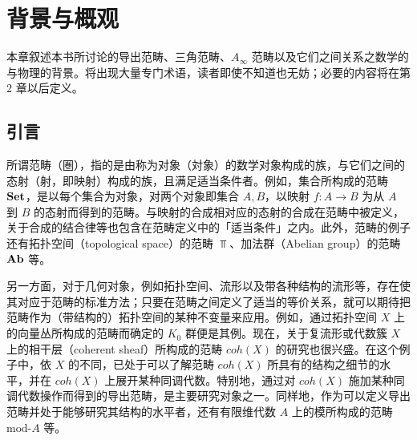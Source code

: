 \chapter{背景与概观}

本章叙述本书所讨论的导出范畴、三角范畴、$A_\infty$ 范畴以及它们之间关系之数学的与物理的背景。将出现大量专门术语，读者即使不知道也无妨；必要的内容将在第 2 章以后定义。

\section{引言}

所谓范畴（圏），指的是由称为对象（対象）的数学对象构成的族，与它们之间的态射（射，即映射）构成的族，且满足适当条件者。例如，集合所构成的范畴 $\mathbf{Set}$，是以每个集合为对象，对两个对象即集合 $A,B$，以映射 $f\colon A\to B$ 为从 $A$ 到 $B$ 的态射而得到的范畴。与映射的合成相对应的态射的合成在范畴中被定义，关于合成的结合律等也包含在范畴定义中的「适当条件」之内。此外，范畴的例子还有拓扑空间（topological space）的范畴 $\Top$、加法群（Abelian group）的范畴 $\mathbf{Ab}$ 等。


另一方面，对于几何对象，例如拓扑空间、流形以及带各种结构的流形等，存在使其对应于范畴的标准方法；只要在范畴之间定义了适当的等价关系，就可以期待把范畴作为（带结构的）拓扑空间的某种不变量来应用。例如，通过拓扑空间 $X$ 上的向量丛所构成的范畴而确定的 $K_0$ 群便是其例。现在，关于复流形或代数簇 $X$ 上的相干层（coherent sheaf）所构成的范畴 $\mathit{coh}(X)$ 的研究也很兴盛。在这个例子中，依 $X$ 的不同，已处于可以了解范畴 $\mathit{coh}(X)$ 所具有的结构之细节的水平，并在 $\mathit{coh}(X)$ 上展开某种同调代数。特别地，通过对 $\mathit{coh}(X)$ 施加某种同调代数操作而得到的导出范畴，是主要研究对象之一。同样地，作为可以定义导出范畴并处于能够研究其结构的水平者，还有有限维代数 $A$ 上的模所构成的范畴 $\mathrm{mod}\text{-}A$ 等。



